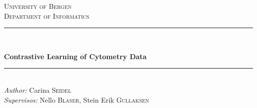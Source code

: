 \begin{titlepage}

    \newcommand{\HRule}{\rule{\linewidth}{0.5mm}} %
    
    \center%
     
    
    \textsc{\LARGE University of Bergen \\ Department of Informatics}\\[1.5cm] %
    
    
    \HRule \\[0.5cm]
    \begin{Huge}
        \bfseries{Contrastive Learning of Cytometry Data}\\[0.7cm] %
    \end{Huge}
    \HRule \\[0.5cm]
     
    
    \large \emph{Author:} Carina \textsc{Seidel}\\ %

    \large \emph{Supervisos:} Nello \textsc{Blaser}, Stein Erik \textsc{Gullaksen}\\[2cm] %
    
    

\end{titlepage}
